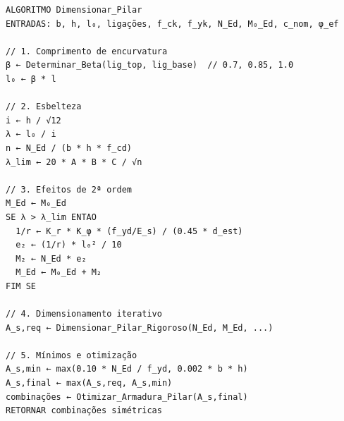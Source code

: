 \begin{lstlisting}[style=PseudoStyle, basicstyle=\ttfamily\normalsize, caption={Dimensionamento de pilares à flexão composta reta (pilar\_service.py)}, label={alg:pilar}]
ALGORITMO Dimensionar_Pilar
ENTRADAS: b, h, l₀, ligações, f_ck, f_yk, N_Ed, M₀_Ed, c_nom, φ_ef

// 1. Comprimento de encurvatura
β ← Determinar_Beta(lig_top, lig_base)  // 0.7, 0.85, 1.0
l₀ ← β * l

// 2. Esbelteza
i ← h / √12
λ ← l₀ / i
n ← N_Ed / (b * h * f_cd)
λ_lim ← 20 * A * B * C / √n

// 3. Efeitos de 2ª ordem 
M_Ed ← M₀_Ed
SE λ > λ_lim ENTAO
  1/r ← K_r * K_φ * (f_yd/E_s) / (0.45 * d_est)
  e₂ ← (1/r) * l₀² / 10
  M₂ ← N_Ed * e₂
  M_Ed ← M₀_Ed + M₂
FIM SE

// 4. Dimensionamento iterativo
A_s,req ← Dimensionar_Pilar_Rigoroso(N_Ed, M_Ed, ...)

// 5. Mínimos e otimização
A_s,min ← max(0.10 * N_Ed / f_yd, 0.002 * b * h)
A_s,final ← max(A_s,req, A_s,min)
combinações ← Otimizar_Armadura_Pilar(A_s,final)
RETORNAR combinações simétricas
\end{lstlisting}


